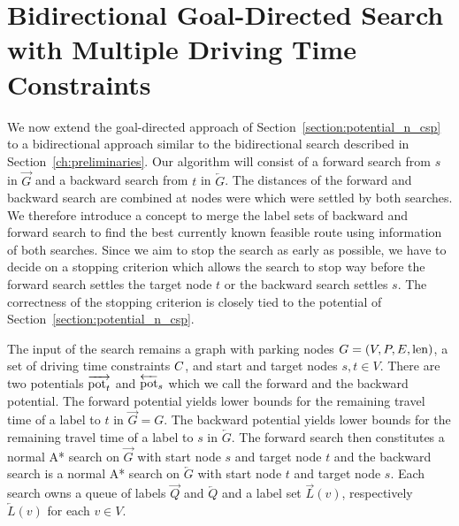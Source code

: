 \section{Bidirectional Goal-Directed Search with Multiple Driving Time Constraints\label{sec:bidir_astar}}
We now extend the goal-directed approach of Section~\ref{section:potential_n_csp} to a bidirectional approach similar to the bidirectional search described in Section~\ref{ch:preliminaries}. Our algorithm will consist of a forward search from $s$ in $\overrightarrow{G}$ and a backward search from $t$ in $\overleftarrow{G}$. The distances of the forward and backward search are combined at nodes were which were settled by both searches. We therefore introduce a concept to merge the label sets of backward and forward search to find the best currently known feasible route using information of both searches. Since we aim to stop the search as early as possible, we have to decide on a stopping criterion which allows the search to stop way before the forward search settles the target node $t$ or the backward search settles $s$. The correctness of the stopping criterion is closely tied to the potential of Section~\ref{section:potential_n_csp}.

The input of the search remains a graph with parking nodes $G=(V, P, E,\operatorname{len})$, a set of driving time constraints $C$, and start and target nodes $s,t \in V$. There are two potentials $\overrightarrow{\operatorname{pot}_t}$ and $\overleftarrow{\operatorname{pot}}_s$ which we call the forward and the backward potential. The forward potential yields lower bounds for the remaining travel time of a label to $t$ in $\overrightarrow{G}=G$. The backward potential yields lower bounds for the remaining travel time of a label to $s$ in $\overleftarrow{G}$. The forward search then constitutes a normal A* search on $\overrightarrow{G}$ with start node $s$ and target node $t$ and the backward search is a normal A* search on $\overleftarrow{G}$ with start node $t$ and target node $s$. Each search owns a queue of labels $\overrightarrow{Q}$ and $\overleftarrow{Q}$ and a label set $\overrightarrow{L}(v)$, respectively $\overleftarrow{L}(v)$ for each $v \in V$.

